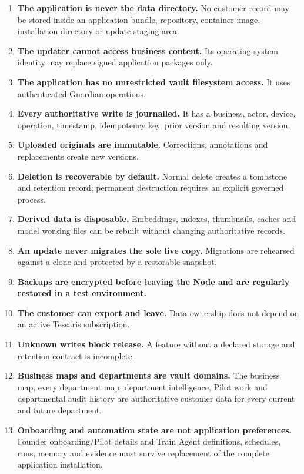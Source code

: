 \documentclass[11pt]{article}
\begin{document}
\begin{enumerate}
  \item \textbf{The application is never the data directory.} No customer record may be stored inside an application bundle, repository, container image, installation directory or update staging area.
  \item \textbf{The updater cannot access business content.} Its operating-system identity may replace signed application packages only.
  \item \textbf{The application has no unrestricted vault filesystem access.} It uses authenticated Guardian operations.
  \item \textbf{Every authoritative write is journalled.} It has a business, actor, device, operation, timestamp, idempotency key, prior version and resulting version.
  \item \textbf{Uploaded originals are immutable.} Corrections, annotations and replacements create new versions.
  \item \textbf{Deletion is recoverable by default.} Normal delete creates a tombstone and retention record; permanent destruction requires an explicit governed process.
  \item \textbf{Derived data is disposable.} Embeddings, indexes, thumbnails, caches and model working files can be rebuilt without changing authoritative records.
  \item \textbf{An update never migrates the sole live copy.} Migrations are rehearsed against a clone and protected by a restorable snapshot.
  \item \textbf{Backups are encrypted before leaving the Node and are regularly restored in a test environment.}
  \item \textbf{The customer can export and leave.} Data ownership does not depend on an active Tessaris subscription.
  \item \textbf{Unknown writes block release.} A feature without a declared storage and retention contract is incomplete.
  \item \textbf{Business maps and departments are vault domains.} The business map, every department map, department intelligence, Pilot work and departmental audit history are authoritative customer data for every current and future department.
  \item \textbf{Onboarding and automation state are not application preferences.} Founder onboarding/Pilot details and Train Agent definitions, schedules, runs, memory and evidence must survive replacement of the complete application installation.

\end{enumerate}
\end{document}
